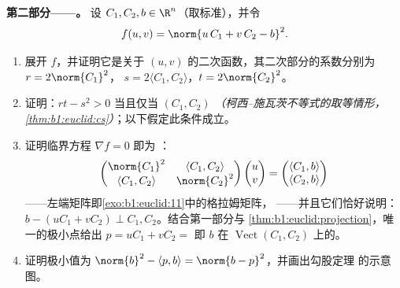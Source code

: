 \begin{problem}
\medskip
\noindent\textbf{第二部分——。} 设 $C_1,
C_2, b \in \R^n$（取标准），并令
\[
f(u, v) = \norm{u\,C_1 + v\,C_2 - b}^2 .
\]
\begin{enumerate}[resume]
  \item 展开 $f$，并证明它是关于 $(u,
        v)$ 的二次函数，其二次部分的系数分别为 $r = 2\norm{C_1}^2$，
        $s = 2\langle C_1, C_2\rangle$，$t = 2\norm{C_2}^2$。
  \item 证明：$rt - s^2 > 0$ 当且仅当 $(C_1, C_2)$
        \emph{（柯西–施瓦茨不等式的取等情形，
        \cref{thm:b1:euclid:cs}）}；以下假定此条件成立。
  \item 证明临界方程 $\nabla f = 0$ 即为
        \emph{}：
        \[
        \begin{pmatrix}
        \norm{C_1}^2 & \langle C_1, C_2\rangle\\
        \langle C_1, C_2\rangle & \norm{C_2}^2
        \end{pmatrix}
        \begin{pmatrix} u\\ v\end{pmatrix}
        =
        \begin{pmatrix} \langle C_1, b\rangle\\ \langle C_2,
        b\rangle\end{pmatrix}
        \]
——左端矩阵即\cref{exo:b1:euclid:11}中的格拉姆矩阵，
——并且它们恰好说明：$b - (uC_1 + vC_2)
        \perp C_1, C_2$。结合第一部分与
        \cref{thm:b1:euclid:projection}，唯一的极小点给出
        $p = uC_1 + vC_2 =$ 即
        $b$ 在 $\operatorname{Vect}(C_1, C_2)$ 上的。
  \item 证明极小值为 $\norm{b}^2 - \langle p,
        b\rangle = \norm{b - p}^2$，并画出勾股定理
        的示意图。
\end{enumerate}


\end{problem}
